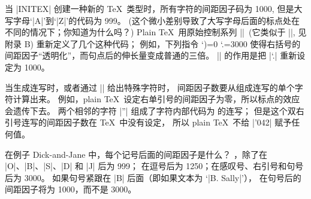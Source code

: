 \ddanger 当 |INITEX| 创建一种新的 \TeX\ 类型时，所有字符的间距因子码为 1000,
但是大写字母`|A|'到`|Z|'的代码为 999。%
(这个微小差别导致了大写字母后面的标点处在不同的情况下；你知道为什么吗？)
Plain \TeX\ 用原始控制系列 |\sfcode|~(它类似于 |\catcode|, 见附录 B)%
重新定义了几个这种代码；
例如，下列指令
\begintt
\sfcode`)=0      \sfcode`.=3000
\endtt
使得右括号的间距因子``透明化''，而句点后的伸长量变成普通的三倍。
|\frenchspacing| 的作用是把 |\sfcode`.| 重新设定为 1000。

\ddanger 当生成连写时，或者通过 |\char| 给出特殊字符时，
间距因子数要从组成连写的单个字符计算出来。
例如，plain \TeX\ 设定右单引号的间距因子为零，所以标点的效应会遗传下去。
两个相邻的字符 |''| 组成了字符内部代码为  的连写；
但是这个双右引号连写的间距因子数在 \TeX\ 中没有设定，
所以 plain \TeX\ 不给 |\sfcode'042| 赋予任何值。

\ddangerexercise 在例子 Dick-and-Jane 中，每个记号后面的间距因子是什么？
，除了在 |O|、|B|、|S|、|D| 和 |J| 后为 999；
在逗号后为 1250；在感叹号、右引号和句号后为 3000。
如果句号紧跟在 |B| 后面（即如果文本为 `|B. Sally|'），
在句号后的间距因子将为 1000，而不是 3000。

